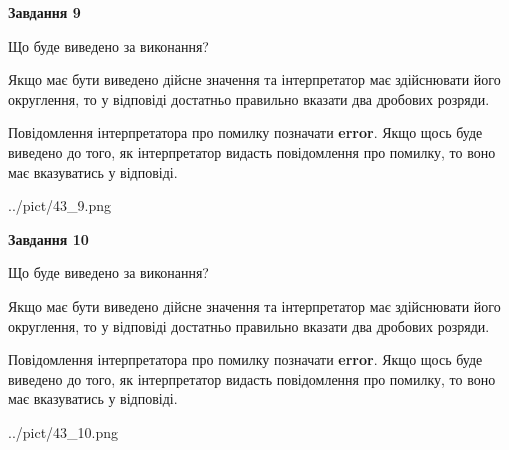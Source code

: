 \documentclass[12pt, ukrainian]{article}
\begin{document}
{\begin {Large}
{\begin {center}\textbf{Завдання 9}\end {center}}\par
Що буде виведено за виконання? \par

Якщо має бути виведено дійсне значення та інтерпретатор має здійснювати його округлення, 
то у відповіді достатньо правильно вказати два дробових розряди.

Повідомлення інтерпретатора про помилку позначати \textbf{error}.
Якщо щось буде виведено до того, як інтерпретатор видасть повідомлення про помилку, 
то воно має вказуватись у відповіді. \par

\begin{center}
	{../pict/43_9.png}
\end{center}
\newpage

{\begin {center}\textbf{Завдання 10}\end {center}}\par
Що буде виведено за виконання? \par

Якщо має бути виведено дійсне значення та інтерпретатор має здійснювати його округлення, 
то у відповіді достатньо правильно вказати два дробових розряди.

Повідомлення інтерпретатора про помилку позначати \textbf{error}.
Якщо щось буде виведено до того, як інтерпретатор видасть повідомлення про помилку, 
то воно має вказуватись у відповіді. \par

\begin{center}
	{../pict/43_10.png}
\end{center}
\newpage

\end {Large}}
\end{document}
